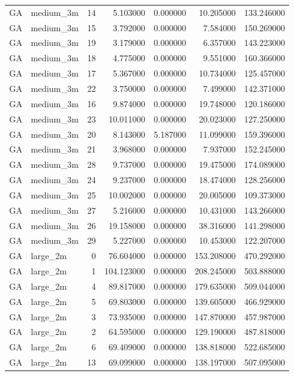 \begin{tabular}{llrrrrr}
GA & medium_3m & 14 & 5.103000 & 0.000000 & 10.205000 & 133.246000 \\
GA & medium_3m & 15 & 3.792000 & 0.000000 & 7.584000 & 150.269000 \\
GA & medium_3m & 19 & 3.179000 & 0.000000 & 6.357000 & 143.223000 \\
GA & medium_3m & 18 & 4.775000 & 0.000000 & 9.551000 & 160.366000 \\
GA & medium_3m & 17 & 5.367000 & 0.000000 & 10.734000 & 125.457000 \\
GA & medium_3m & 22 & 3.750000 & 0.000000 & 7.499000 & 142.371000 \\
GA & medium_3m & 16 & 9.874000 & 0.000000 & 19.748000 & 120.186000 \\
GA & medium_3m & 23 & 10.011000 & 0.000000 & 20.023000 & 127.250000 \\
GA & medium_3m & 20 & 8.143000 & 5.187000 & 11.099000 & 159.396000 \\
GA & medium_3m & 21 & 3.968000 & 0.000000 & 7.937000 & 152.245000 \\
GA & medium_3m & 28 & 9.737000 & 0.000000 & 19.475000 & 174.089000 \\
GA & medium_3m & 24 & 9.237000 & 0.000000 & 18.474000 & 128.256000 \\
GA & medium_3m & 25 & 10.002000 & 0.000000 & 20.005000 & 109.373000 \\
GA & medium_3m & 27 & 5.216000 & 0.000000 & 10.431000 & 143.266000 \\
GA & medium_3m & 26 & 19.158000 & 0.000000 & 38.316000 & 141.298000 \\
GA & medium_3m & 29 & 5.227000 & 0.000000 & 10.453000 & 122.207000 \\
GA & large_2m & 0 & 76.604000 & 0.000000 & 153.208000 & 470.292000 \\
GA & large_2m & 1 & 104.123000 & 0.000000 & 208.245000 & 503.888000 \\
GA & large_2m & 4 & 89.817000 & 0.000000 & 179.635000 & 509.044000 \\
GA & large_2m & 5 & 69.803000 & 0.000000 & 139.605000 & 466.929000 \\
GA & large_2m & 3 & 73.935000 & 0.000000 & 147.870000 & 457.987000 \\
GA & large_2m & 2 & 64.595000 & 0.000000 & 129.190000 & 487.818000 \\
GA & large_2m & 6 & 69.409000 & 0.000000 & 138.818000 & 522.685000 \\
GA & large_2m & 13 & 69.099000 & 0.000000 & 138.197000 & 507.095000 \\

\end{tabular}
